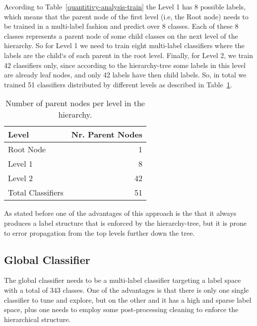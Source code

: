 \documentclass[11pt,a4paper]{article}
\begin{document}
According to Table~\ref{quantitivy-analysis-train} the Level 1 has 8 possible
labels, which means that the parent node of the first level (i.e, the Root node)
needs to be trained in a multi-label fashion and predict over 8 classes. Each of
these 8 classes represents a parent node of some child classes on the
next level of the hierarchy. So for Level 1 we need to train eight multi-label
classifiers where the labels are the child`s of each parent in the root level.
Finally, for Level 2, we train 42 classifiers only, since according to the
hierarchy-tree some labels in this level are already leaf nodes, and only 42
labels have then child labels. So, in total we trained 51 classifiers
distributed by different levels as described in Table~\ref{parent-per-node-classifiers}.

\begin{table}[!h]
\begin{center}
\begin{tabular}{|l|r|}
\hline\centering\textbf{Level}  &  \textbf{Nr. Parent Nodes}    \\
\hline
Root Node         &  1       \\
Level 1           &  8       \\
Level 2           &  42      \\
\hline
Total Classifiers & 51       \\
\hline
\end{tabular}
\end{center}
\caption{\label{parent-per-node-classifiers}Number of parent nodes per level in
the hierarchy.}
\end{table}

As stated before one of the advantages of this approach is the that it always
produces a label structure that is enforced by the hierarchy-tree, but it is
prone to error propagation from the top levels further down the tree.


\subsection{Global Classifier}

The global classifier needs to be a multi-label classifier targeting a label
space with a total of 343 classes. One of the advantages is that there is only
one single classifier to tune and explore, but on the other and it has a high
and sparse label space, plus one needs to employ some post-processing cleaning
to enforce the hierarchical structure.
\end{document}
